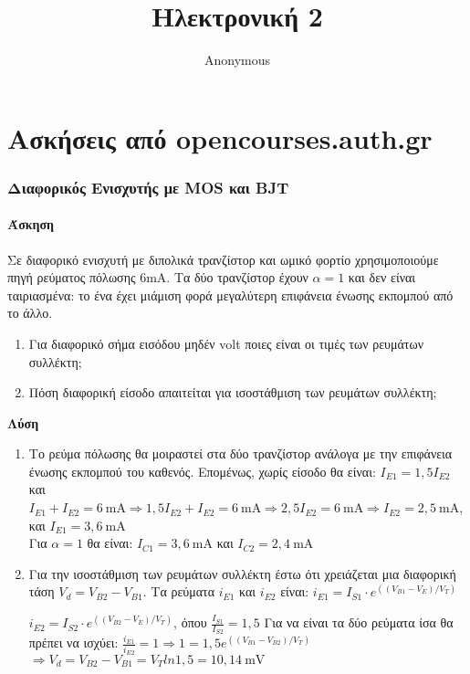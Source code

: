 \documentclass[11pt,a4paper,titlepage,fleqn]{article}
\author{Anonymous}
\title{Ηλεκτρονική 2}
\begin{document}
		\maketitle
		
		\tableofcontents

\part{Ασκήσεις από opencourses.auth.gr}
\section{Διαφορικός Ενισχυτής με MOS και BJT}

	\subsection{Άσκηση}
	\label{sec:D.F16F13}
	
	Σε διαφορικό ενισχυτή με διπολικά τρανζίστορ και ωμικό φορτίο χρησιμοποιούμε πηγή ρεύματος πόλωσης 6mA. Τα δύο τρανζίστορ έχουν $\alpha=1$ και δεν είναι ταιριασμένα: το ένα έχει μιάμιση φορά μεγαλύτερη επιφάνεια ένωσης εκπομπού από το άλλο.
	\begin{enumerate}[label=\noanw\alph*.]
		\item Για διαφορικό σήμα εισόδου μηδέν volt ποιες είναι οι τιμές των ρευμάτων συλλέκτη;
		\item Πόση διαφορική είσοδο απαιτείται για ισοστάθμιση των ρευμάτων συλλέκτη;
	\end{enumerate}

	\textbf{Λύση}
		\begin{enumerate}[label=\noanw\alph*.]
		\item Το ρεύμα πόλωσης θα μοιραστεί στα δύο τρανζίστορ ανάλογα με την επιφάνεια  ένωσης εκπομπού του καθενός. Επομένως, χωρίς είσοδο θα είναι: $I_{E1}=1,5I_{E2}$ και
		$I_{E1}+I_{E2}=6\SI{}{\mA} \Rightarrow 1,5I_{E2}+I_{E2}=6\SI{}{\mA} \Rightarrow 2,5I_{E2}=6\SI{}{\mA} \Rightarrow I_{E2}=2,5\SI{}{\mA}$, και $I_{E1}=3,6\SI{}{\mA}$\\
		Για $\alpha=1$ θα είναι: $I_{C1}=3,6\SI{}{\mA}$ και $I_{C2}=2,4\SI{}{\mA}$
		\item Για την ισοστάθμιση των ρευμάτων συλλέκτη έστω ότι χρειάζεται μια διαφορική τάση $V_d=V_{B2}-V_{B1}$.
		Τα ρεύματα $i_{E1}$ και $i_{E2}$ είναι: 
		$i_{E1} = I_{S1} \cdot e ^ {((V_{B1} - V_E) / V_T)}$ 
		
		
		$i_{E2} = I_{S2} \cdot e ^ {((V_{B2} - V_E) / V_T)}$,
		όπου $\frac{I_{S1}}{I_{S2}} = 1,5$ 
		Για να είναι τα δύο ρεύματα ίσα θα πρέπει να ισχύει:
		$\frac{i_{E1}}{i_{E2}} = 1 \Rightarrow 1 =   1,5 e ^ {((V_{B1} - V_{B2}) / V_T)} $  $\Rightarrow V_d = V_{B2}-V_{B1}=V_T ln1,5=10,14\SI{}{\mV}$
		\end{enumerate}
	
\end{document}
